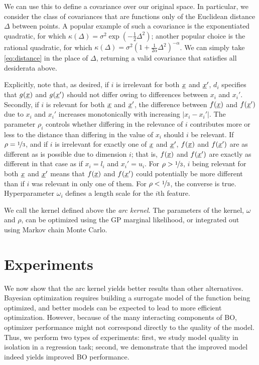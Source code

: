 \documentclass{article}
\newcommand{\vect}[1]{\underline{\smash{#1}}}
\renewcommand{\v}[1]{\vect{#1}}
\newcommand{\br}{}%
\begin{document}
We can use this to define a covariance over our original space. In particular, we consider the class of covariances that are functions only of the Euclidean distance $\Delta$ between points. A popular example of such a covariance is the exponentiated quadratic, for which $\kappa(\Delta) = \sigma^2 \exp(-\frac{1}{2} \Delta^2)$; another popular choice is the rational quadratic, for which $\kappa(\Delta) = \sigma^2 (1+\frac{1}{2\alpha} \Delta^2)^{-\alpha}$. We can simply take \eqref{eq:distance} in the place of $\Delta$, returning a valid covariance that satisfies all desiderata above. 

Explicitly, note that, as desired, if $i$ is irrelevant for both $\v{x}$ and $\v{x}'$, $d\br_i$ specifies that $g(\v{x})$ and $g(\v{x}')$ should not differ owing to differences between $x_i$ and $x_i'$. Secondly, if $i$ is relevant for both $\v{x}$ and $\v{x}'$, the difference between $f(\v{x})$ and $f(\v{x}')$ due to $x_i$ and $x_i'$ increases monotonically with increasing $\left|x_i-x_i'\right|$. The parameter $\rho_i$ controls whether differing in the relevance of $i$ contributes more or less to the distance than differing in the value of $x_i$ should $i$ be relevant. If $\rho = \nicefrac{1}{3}$, and if $i$ is irrelevant for exactly one of $\v{x}$ and $\v{x}'$, $f(\v{x})$ and $f(\v{x}')$ are as different as is possible due to dimension $i$; that is, $f(\v{x})$ and $f(\v{x}')$ are exactly as different in that case as if $x_i=l_i$ and $x_i'=u_i$. For $\rho>\nicefrac{1}{3}$, $i$ being relevant for both $\v{x}$ and $\v{x}'$ means that $f(\v{x})$ and $f(\v{x}')$ could potentially be more different than if
$i$ was relevant in only one of them. For $\rho<\nicefrac{1}{3}$, the converse is true. Hyperparameter $\omega_i$ defines a length scale for the $i$th feature. 

We call the kernel defined above the \emph{arc kernel}. The parameters of the kernel, $\omega$ and $\rho$, can be optimized using the GP marginal likelihood, or integrated out using Markov chain Monte Carlo.




\section{Experiments}

We now show that the arc kernel yields better results than other alternatives.  Bayesian optimization requires building a surrogate model of the function being optimized, and better models can be expected to lead to more efficient optimization.  However, because of the many interacting components of BO, optimizer performance might not correspond directly to the quality of the model.  Thus, we perform two types of experiments: first, we study model quality in isolation in a regression task; second, we demonstrate that the improved model indeed yields improved BO performance.
\end{document}
